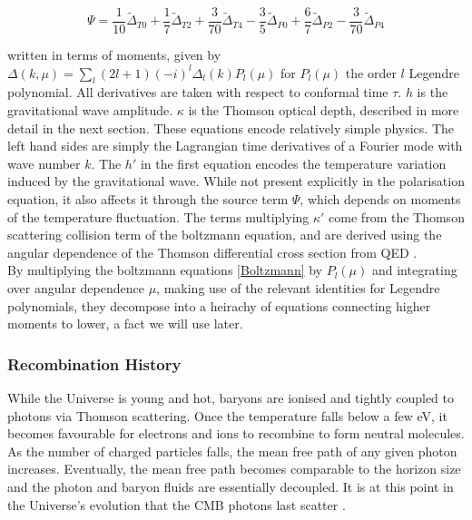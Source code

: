 \documentclass[a4paper,10pt]{article}
\begin{document}
\begin{equation}
\Psi = \frac{1}{10}\tilde{\Delta}_{T0} + \frac{1}{7}\tilde{\Delta}_{T2} + \frac{3}{70}\tilde{\Delta}_{T4} - \frac{3}{5}\tilde{\Delta}_{P0} + \frac{6}{7}\tilde{\Delta}_{P2} - \frac{3}{70}\tilde{\Delta}_{P4}
\end{equation}

written in terms of moments, given by $\Delta(k, \mu) = \sum_l (2l+1)(-i)^l\Delta_l(k)P_l(\mu)$ for $P_l(\mu)$ the order $l$ Legendre polynomial. All derivatives are taken with respect to conformal time $\tau$. $h$ is the gravitational wave amplitude. $\kappa$ is the Thomson optical depth, described in more detail in the next section. These equations encode relatively simple physics. The left hand sides are simply the Lagrangian time derivatives of a Fourier mode with wave number $k$. The $h'$ in the first equation encodes the temperature variation induced by the gravitational wave. While not present explicitly in the polarisation equation, it also affects it through the source term $\Psi$, which depends on moments of the temperature fluctuation. The terms multiplying $\kappa'$ come from the Thomson scattering collision term of the boltzmann equation, and are derived using the angular dependence of the Thomson differential cross section from QED \cite{QBM, kowosky}. \\


By multiplying the boltzmann equations \ref{Boltzmann} by $P_l(\mu)$ and integrating over angular dependence $\mu$, making use of the relevant identities for Legendre polynomials, they decompose into a heirachy of equations connecting higher moments to lower, a fact we will use later.

\subsubsection{Recombination History}

While the Universe is young and hot, baryons are ionised and tightly coupled to photons via Thomson scattering. Once the temperature falls below a few eV, it becomes favourable for electrons and ions to recombine to form neutral molecules. As the number of charged particles falls, the mean free path of any given photon increases. Eventually, the mean free path becomes comparable to the horizon size and the photon and baryon fluids are essentially decoupled. It is at this point in the Universe’s evolution that the CMB photons last scatter \cite{Pritchard}.\\
\end{document}
